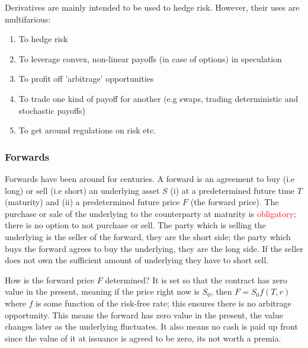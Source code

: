 \documentclass[9pt]{extarticle}
\begin{document}
Derivatives are mainly intended to be used to hedge risk. However, their 
uses are multifarious:
\begin{enumerate}
  \item To hedge risk
  \item To leverage convex, non-linear payoffs (in case of options) in speculation
  \item To profit off 'arbitrage' opportunities
  \item To trade one kind of payoff for another (e.g swaps, trading deterministic and stochastic payoffs)
  \item To get around regulations on risk etc.
\end{enumerate}

\subsubsection{Forwards}

Forwards have been around for centuries. A forward is an agreement 
to buy (i.e long) or sell (i.e short) an underlying asset $S$ 
(i) at a predetermined future time $T$ (maturity) and (ii) a predetermined 
future price $F$ (the forward price). The purchase or sale of the underlying to the 
counterparty at maturity 
is \textcolor{red}{obligatory}; there is no option to not purchase or sell. The party which is selling the underlying 
is the seller of the forward, they are the short side; 
the party which buys the forward agrees to buy the underlying, they are the long side. If 
the seller does not own the sufficient amount of underlying they have to short 
sell. 

How is the forward price $F$ determined? It is set so that the contract has 
zero value in the present, meaning if the price right now is $S_0$, then 
$F=S_0f(T,r)$ where $f$ is some function of the risk-free rate; 
this ensures there is no arbitrage opportunity. This means the forward 
has zero value in the present, the value changes later as the underlying fluctuates. 
It also means no cash is paid up front since the value of it at issuance 
is agreed to be zero, its not worth a premia. 
\end{document}
